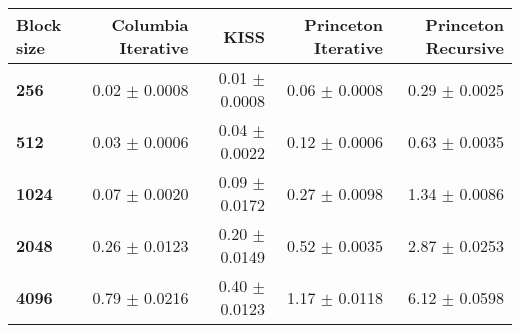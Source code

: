\begin{tabular}{lrrrr}\toprule
\textbf{Block size}  & \textbf{Columbia Iterative} & \textbf{KISS} & \textbf{Princeton Iterative} & \textbf{Princeton Recursive}\\\midrule
\textbf{256}  & 0.02 $\pm$ 0.0008 & 0.01 $\pm$ 0.0008 & 0.06 $\pm$ 0.0008 & 0.29 $\pm$ 0.0025\\
\textbf{512}  & 0.03 $\pm$ 0.0006 & 0.04 $\pm$ 0.0022 & 0.12 $\pm$ 0.0006 & 0.63 $\pm$ 0.0035\\
\textbf{1024}  & 0.07 $\pm$ 0.0020 & 0.09 $\pm$ 0.0172 & 0.27 $\pm$ 0.0098 & 1.34 $\pm$ 0.0086\\
\textbf{2048}  & 0.26 $\pm$ 0.0123 & 0.20 $\pm$ 0.0149 & 0.52 $\pm$ 0.0035 & 2.87 $\pm$ 0.0253\\
\textbf{4096} & 0.79 $\pm$ 0.0216 & 0.40 $\pm$ 0.0123 & 1.17 $\pm$ 0.0118 & 6.12 $\pm$ 0.0598\\
\bottomrule
\end{tabular}
